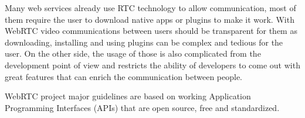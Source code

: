 Many web services already use RTC technology to allow communication, most of them require the user to download native apps or plugins to make it work. With WebRTC video communications between users should be transparent for them as downloading, installing and using plugins can be complex and tedious for the user. On the other side, the usage of those is also complicated from the development point of view and restricts the ability of developers to come out with great features that can enrich the communication between people.

WebRTC project major guidelines are based on working Application Programming Interfaces (APIs)  that are open source, free and standardized.


%
%
%
